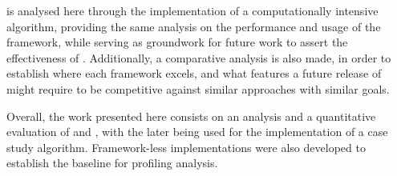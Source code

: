 \documentclass[main.tex]{subfiles}
\begin{document}
\starpu is analysed here through the implementation of a computationally intensive algorithm, providing the same analysis on the performance and usage of the framework, while serving as groundwork for future work to assert the effectiveness of \gama. Additionally, a comparative analysis is also made, in order to establish where each framework excels, and what features a future release of \gama might require to be competitive against similar approaches with similar goals.

Overall, the work presented here consists on an analysis and a quantitative evaluation of \gama and \starpu, with the later being used for the implementation of a case study algorithm. Framework-less implementations were also developed to establish the baseline for profiling analysis.
\end{document}
